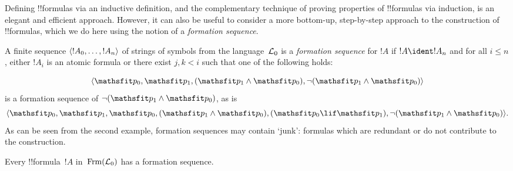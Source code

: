 \documentclass[../../../include/open-logic-section]{subfiles}
\begin{document}


Defining !!{formula}s via an inductive definition, and the
complementary technique of proving properties of !!{formula}s via
induction, is an elegant and efficient approach. However, it can
also be useful to consider a more bottom-up, step-by-step approach
to the construction of !!{formula}s, which we do here using the
notion of a \emph{formation sequence}.

\begin{defn}
A finite sequence $\langle !A_0,\dotsc,!A_n \rangle$ of strings of
symbols from the language~$\Lang L_0$ is a \emph{formation
sequence} for $!A$ if $!A \ident !A_n$ and for all $i \leq n$,
either $!A_i$ is an atomic formula or there exist $j,k < i$
such that one of the following holds:
\begin{enumerate}
\end{enumerate}
\end{defn}

\begin{ex}
\[
\tuple{
    \Obj p_0,
    \Obj p_1,
    (\Obj p_1 \land \Obj p_0),
    \lnot (\Obj p_1 \land \Obj p_0)
}
\]
is a formation sequence of
$\lnot (\Obj p_1 \land \Obj p_0)$, as is
\[
\tuple{
    \Obj p_0,
    \Obj p_1,
    \Obj p_0,
    (\Obj p_1 \land \Obj p_0),
    (\Obj p_0 \lif \Obj p_1),
    \lnot (\Obj p_1 \land \Obj p_0)
}.
\]
%
As can be seen from the second example, formation sequences
may contain `junk': formulas which are redundant or do not
contribute to the construction.
\end{ex}

\begin{prop}
Every !!{formula}~$!A$ in~$\Frm[L_0]$ has a formation sequence.
\end{prop}
\end{document}
